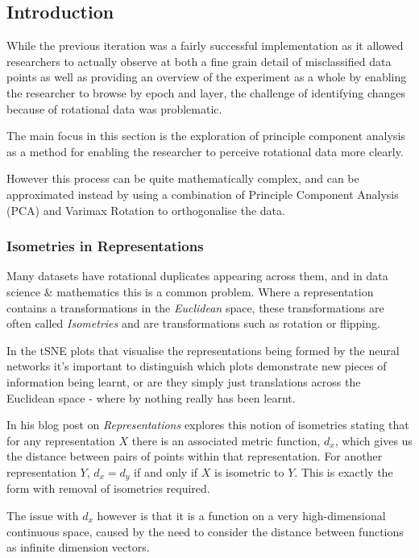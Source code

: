 \documentclass[a4paper,11pt,titlepage]{article}
\begin{document}
	\subsection{Introduction}
	While the previous iteration was a fairly successful implementation as it allowed researchers to actually observe at both a fine grain detail of misclassified data points as well as providing an overview of the experiment as a whole by enabling the researcher to browse by epoch and layer, the challenge of identifying changes because of rotational data was problematic.
	\par 
	The main focus in this section is the exploration of principle component analysis as a method for enabling the researcher to perceive rotational data more clearly. 
	\par 
	However this process can be quite mathematically complex, and can be approximated instead by using a combination of Principle Component Analysis (PCA) and Varimax Rotation to orthogonalise the data. 	
	\par 

	\subsubsection{Isometries in Representations}
	Many datasets have rotational duplicates appearing across them, and in data science \& mathematics this is a common problem. Where a representation contains a transformations in the \textit{Euclidean} space, these transformations are often called \textit{Isometries} and are transformations such as rotation or flipping. 
	\par 
	In the tSNE plots that visualise the representations being formed by the neural networks it's important to distinguish which plots demonstrate new pieces of information being learnt, or are they simply just translations across the Euclidean space - where by nothing really has been learnt.
	\par 
	In his blog post on \textit{Representations} \cite{Olah2014} explores this notion of isometries stating that for any representation $ X $ there is an associated metric function, $ d_{x} $, which gives us the distance between pairs of points within that representation. For another representation $ Y $, $ d_{x} = d_{y} $ if and only if $ X $ is isometric to $ Y $. This is exactly the form with removal of isometries required.
		\par 
		The issue with $ d_{x} $ however is that it is a function on a very high-dimensional continuous space, caused by the need to consider the distance between functions as infinite dimension vectors.
		 
\end{document}
